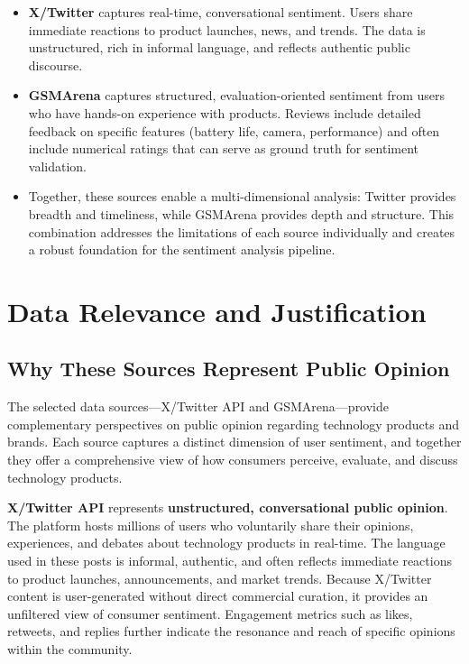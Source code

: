 \documentclass[12pt]{article}
\begin{document}
\begin{itemize}
    \item \textbf{X/Twitter} captures real-time, conversational sentiment. Users share immediate reactions to product launches, news, and trends. The data is unstructured, rich in informal language, and reflects authentic public discourse.
    
    \item \textbf{GSMArena} captures structured, evaluation-oriented sentiment from users who have hands-on experience with products. Reviews include detailed feedback on specific features (battery life, camera, performance) and often include numerical ratings that can serve as ground truth for sentiment validation.
    
    \item Together, these sources enable a multi-dimensional analysis: Twitter provides breadth and timeliness, while GSMArena provides depth and structure. This combination addresses the limitations of each source individually and creates a robust foundation for the sentiment analysis pipeline.
\end{itemize}

\section{Data Relevance and Justification}

\subsection{Why These Sources Represent Public Opinion}
The selected data sources—X/Twitter API and GSMArena—provide complementary perspectives on public opinion regarding technology products and brands. Each source captures a distinct dimension of user sentiment, and together they offer a comprehensive view of how consumers perceive, evaluate, and discuss technology products.

\textbf{X/Twitter API} represents \textbf{unstructured, conversational public opinion}. The platform hosts millions of users who voluntarily share their opinions, experiences, and debates about technology products in real-time. The language used in these posts is informal, authentic, and often reflects immediate reactions to product launches, announcements, and market trends. Because X/Twitter content is user-generated without direct commercial curation, it provides an unfiltered view of consumer sentiment. Engagement metrics such as likes, retweets, and replies further indicate the resonance and reach of specific opinions within the community.
\end{document}
